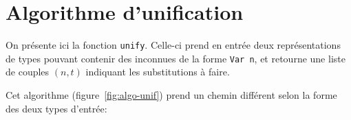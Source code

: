 





\section{Algorithme d'unification}
\label{sec:unif}

On présente ici la fonction \texttt{unify}. Celle-ci prend en entrée deux
représentations de types pouvant contenir des inconnues de la forme \texttt{Var
n}, et retourne une liste de couples $(n, t)$ indiquant les substitutions à
faire.

Cet algorithme (figure~\ref{fig:algo-unif}) prend un chemin différent selon la
forme des deux types d'entrée:

